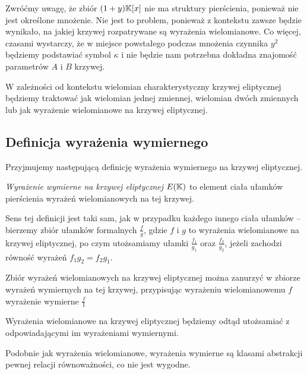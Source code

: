 Zwróćmy uwagę, że zbiór $(1 + y)\mathbb{K}[x]$ nie ma struktury pierścienia,
ponieważ nie jest określone mnożenie.
Nie jest to problem,
ponieważ z kontekstu zawsze będzie wynikało,
na jakiej krzywej rozpatrywane są wyrażenia wielomianowe.
Co więcej, czasami wystarczy,
że w miejsce powstałego podczas mnożenia czynnika $y^2$
będziemy podstawiać symbol $\kappa$
i nie będzie nam potrzebna dokładna znajomość parametrów $A$ i $B$ krzywej.

\begin{remark}
W zależności od kontekstu wielomian charakterystyczny krzywej eliptycznej
będziemy traktować jak wielomian jednej zmiennej, wielomian dwóch zmiennych
lub jak wyrażenie wielomianowe na krzywej eliptycznej.
\end{remark}

\subsection*{Definicja wyrażenia wymiernego}

Przyjmujemy następującą definicję
wyrażenia wymiernego na krzywej eliptycznej.

\begin{definition}
\emph{Wyrażenie wymierne na krzywej eliptycznej $E(\mathbb{K})$}
to element ciała ułamków pierścienia wyrażeń wielomianowych na tej krzywej.
\end{definition}

Sens tej definicji jest taki sam,
jak w przypadku każdego innego ciała ułamków --
bierzemy zbiór ułamków formalnych $\frac{f}{g}$,
gdzie $f$ i $g$ to wyrażenia wielomianowe na krzywej eliptycznej,
po czym utożsamiamy ułamki $\frac{f_1}{g_1}$ oraz $\frac{f_2}{g_2}$,
jeżeli zachodzi równość wyrażeń $f_1g_2 = f_2g_1$.

\begin{fact}
Zbiór wyrażeń wielomianowych na krzywej eliptycznej
można zanurzyć w zbiorze wyrażeń wymiernych na tej krzywej,
przypisując wyrażeniu wielomianowemu $f$ wyrażenie wymierne $\frac{f}{1}$
\end{fact}

\begin{remark}
Wyrażenia wielomianowe na krzywej eliptycznej
będziemy odtąd utożsamiać z odpowiadającymi im wyrażeniami wymiernymi.
\end{remark}

Podobnie jak wyrażenia wielomianowe,
wyrażenia wymierne są klasami abstrakcji pewnej relacji równoważności,
co nie jest wygodne.

